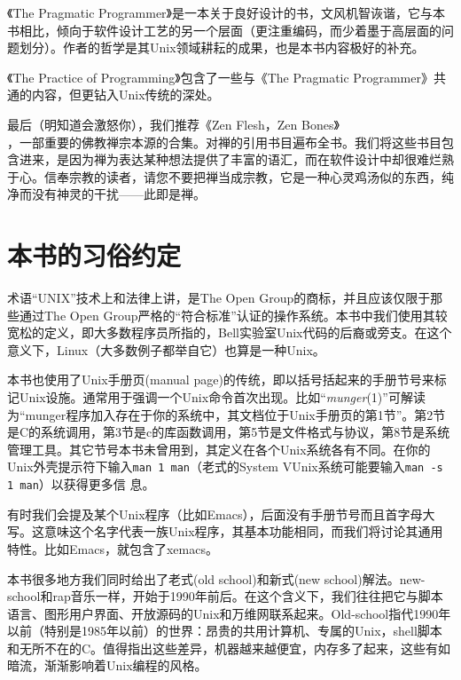\documentclass[12pt,oneside]{book}
\begin{document}
\begin{common-format}
《The Pragmatic Programmer》\cite{Hunt-Thomas}是一本关于良好设计的书，文风机智诙谐，它与本书相比，倾向于软件设计工艺的另一个层面（更注重编码，而少着墨于高层面的问题划分）。作者的哲学是其Unix领域耕耘的成果，也是本书内容极好的补充。

《The Practice of Programming》\cite{Kernighan-Pike99}包含了一些与《The Pragmatic Programmer》共通的内容，但更钻入Unix传统的深处。

最后（明知道会激怒你），我们推荐《Zen Flesh，Zen Bones》\\ \cite{Reps-Senzaki}，一部重要的佛教禅宗本源的合集。对禅的引用书目遍布全书。我们将这些书目包含进来，是因为禅为表达某种想法提供了丰富的语汇，而在软件设计中却很难烂熟于心。信奉宗教的读者，请您不要把禅当成宗教，它是一种心灵鸡汤似的东西，纯净而没有神灵的干扰——此即是禅。

\section{本书的习俗约定}
术语“UNIX”技术上和法律上讲，是The Open Group的商标，并且应该仅限于那些通过The Open Group严格的“符合标准”认证的操作系统。本书中我们使用其较宽松的定义，即大多数程序员所指的，Bell实验室Unix代码的后裔或旁支。在这个意义下，Linux（大多数例子都举自它）也算是一种Unix。

本书也使用了Unix手册页(manual page)的传统，即以括号括起来的手册节号来标记Unix设施。通常用于强调一个Unix命令首次出现。比如“\textit{munger}(1)”可解读为“munger程序加入存在于你的系统中，其文档位于Unix手册页的第1节”。第2节是C的系统调用，第3节是c的库函数调用，第5节是文件格式与协议，第8节是系统管理工具。其它节号本书未曾用到，其定义在各个Unix系统各有不同。在你的Unix外壳提示符下输入\verb+man 1 man+（老式的System VUnix系统可能要输入\verb+man -s 1 man+）以获得更多信
息。

有时我们会提及某个Unix程序（比如Emacs），后面没有手册节号而且首字母大写。这意味这个名字代表一族Unix程序，其基本功能相同，而我们将讨论其通用特性。比如Emacs，就包含了xemacs。

本书很多地方我们同时给出了老式(old school)和新式(new school)解法。new-school和rap音乐一样，开始于1990年前后。在这个含义下，我们往往把它与脚本语言、图形用户界面、开放源码的Unix和万维网联系起来。Old-school指代1990年以前（特别是1985年以前）的世界：昂贵的共用计算机、专属的Unix，shell脚本和无所不在的C。值得指出这些差异，机器越来越便宜，内存多了起来，这些有如暗流，渐渐影响着Unix编程的风格。


\end{common-format}
\end{document}
